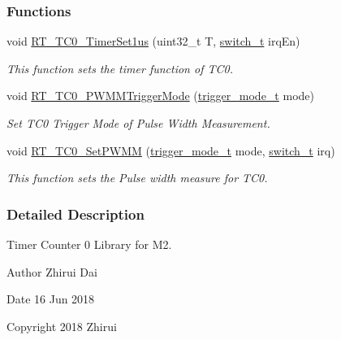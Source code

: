 \subsubsection*{Functions}
\begin{DoxyCompactItemize}
\item 
void \mbox{\hyperlink{a00041_a8e0656cd8304f2e28517ca46b8f854a0}{R\+T\+\_\+\+T\+C0\+\_\+\+Timer\+Set1us}} (uint32\+\_\+t T, \mbox{\hyperlink{a00020_ab43e533f3793920486fb81c580f71564}{switch\+\_\+t}} irq\+En)
\begin{DoxyCompactList}\small\item\em This function sets the timer function of T\+C0. \end{DoxyCompactList}\item 
void \mbox{\hyperlink{a00041_a7e5566d1cc48eb1c7e1ee9844e7c5be5}{R\+T\+\_\+\+T\+C0\+\_\+\+P\+W\+M\+M\+Trigger\+Mode}} (\mbox{\hyperlink{a00020_a6d33f21be3f0c5cf91c5d638e8aca086}{trigger\+\_\+mode\+\_\+t}} mode)
\begin{DoxyCompactList}\small\item\em Set T\+C0 Trigger Mode of Pulse Width Measurement. \end{DoxyCompactList}\item 
void \mbox{\hyperlink{a00041_a45059aa93adb7ba8a83c80a4c2132c8b}{R\+T\+\_\+\+T\+C0\+\_\+\+Set\+P\+W\+MM}} (\mbox{\hyperlink{a00020_a6d33f21be3f0c5cf91c5d638e8aca086}{trigger\+\_\+mode\+\_\+t}} mode, \mbox{\hyperlink{a00020_ab43e533f3793920486fb81c580f71564}{switch\+\_\+t}} irq)
\begin{DoxyCompactList}\small\item\em This function sets the Pulse width measure for T\+C0. \end{DoxyCompactList}\end{DoxyCompactItemize}


\subsubsection{Detailed Description}
Timer Counter 0 Library for M2. 

\begin{DoxyAuthor}{Author}
Zhirui Dai 
\end{DoxyAuthor}
\begin{DoxyDate}{Date}
16 Jun 2018 
\end{DoxyDate}
\begin{DoxyCopyright}{Copyright}
2018 Zhirui 
\end{DoxyCopyright}


